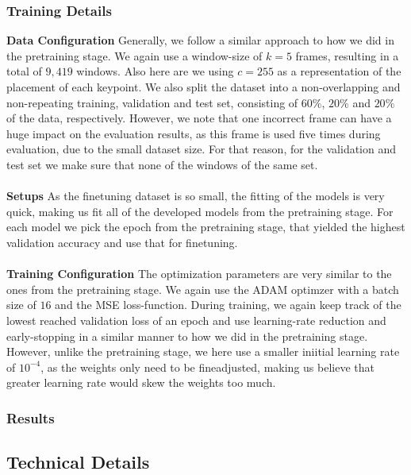 \documentclass[./main.tex]{subfiles}
\begin{document}
\subsubsection{Training Details}
\textbf{Data Configuration} Generally, we follow a similar approach to how we did in the pretraining stage. We again use a window-size of $k = 5$ frames, resulting in a total of $9,419$ windows. Also here are we using $c = 255$ as a representation of the placement of each keypoint. We also split the dataset into a non-overlapping and non-repeating training, validation and test set, consisting of $60\%$, $20\%$ and $20\%$ of the data, respectively. However, we note that one incorrect frame can have a huge impact on the evaluation results, as this frame is used five times during evaluation, due to the small dataset size. For that reason, for the validation and test set we make sure that none of the windows of the same set.
\\
\\
\textbf{Setups} As the finetuning dataset is so small, the fitting of the models is very quick, making us fit all of the developed models from the pretraining stage. For each model we pick the epoch from the pretraining stage, that yielded the highest validation accuracy and use that for finetuning.
\\
\\
\textbf{Training Configuration} The optimization parameters are very similar to the ones from the pretraining stage. We again use the ADAM optimzer with a batch size of $16$ and the MSE loss-function. During training, we again keep track of the lowest reached validation loss of an epoch and use learning-rate reduction and early-stopping in a similar manner to how we did in the pretraining stage. However, unlike the pretraining stage, we here use a smaller iniitial learning rate of $10^{-4}$, as the weights only need to be fineadjusted, making us believe that greater learning rate would skew the weights too much.

\subsubsection{Results}

\subsection*{Technical Details}

\label{sec:experiments}
\end{document}
